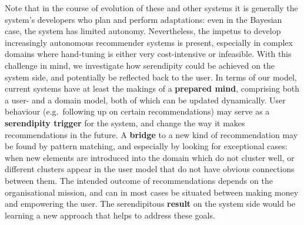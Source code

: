 Note that in the course of evolution of these and other systems it is generally the system's developers who plan and perform adaptations: even in the Bayesian case, the system has limited autonomy. Nevertheless, the impetus to develop increasingly autonomous recommender systems is present, especially in complex domains where hand-tuning is either very cost-intensive or infeasible.  With this challenge in mind, we investigate how serendipity could be achieved on the system side, and potentially be reflected back to the user. In terms of our model, current systems have at least the makings of a \textbf{prepared mind}, comprising both a user- and a domain model, both of which can be updated dynamically. User behaviour (e.g.~following up on certain recommendations) may serve as a \textbf{serendipity trigger} for the system, and change the way it makes recommendations in the future. A \textbf{bridge} to a new kind of recommendation may be found by pattern matching, and especially by looking for exceptional cases: when new elements are introduced into the domain which do not cluster well, or different clusters appear in the user model that do not have obvious connections between them. The intended outcome of recommendations depends on the organisational mission, and can in most cases be situated between making money and empowering the user. The serendipitous \textbf{result} on the system side would be learning a new approach that helps to address these goals.

